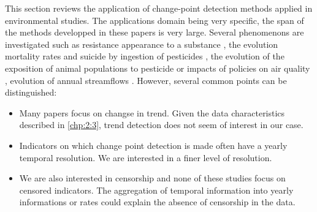 This section reviews the application of change-point detection methods applied in environmental studies. The applications domain being very specific, the span of the methods developped in these papers is very large. Several phenomenons are investigated such as resistance appearance to a substance \cite{Solla2010}, the evolution mortality rates and suicide by ingestion of pesticides \cite{Ko2017}, the evolution of the exposition of animal populations to pesticide \cite{Menger2022} or impacts of policies on air quality \cite{FOMBY2006}, evolution of annual streamflows \cite{Ryberg2020}. However, several common points can be distinguished:      
\begin{itemize}
\item Many papers focus on changse in trend. Given the data characteristics described in \ref{chp:2:3}, trend detection does not seem of interest in our case.
\item Indicators on which change point detection is made often have a yearly temporal resolution. We are interested in a finer level of resolution. 
\item We are also interested in censorship and none of these studies focus on censored indicators. The aggregation of temporal information into yearly informations or rates could explain the absence of censorship in the data.   
\end{itemize}



 

 